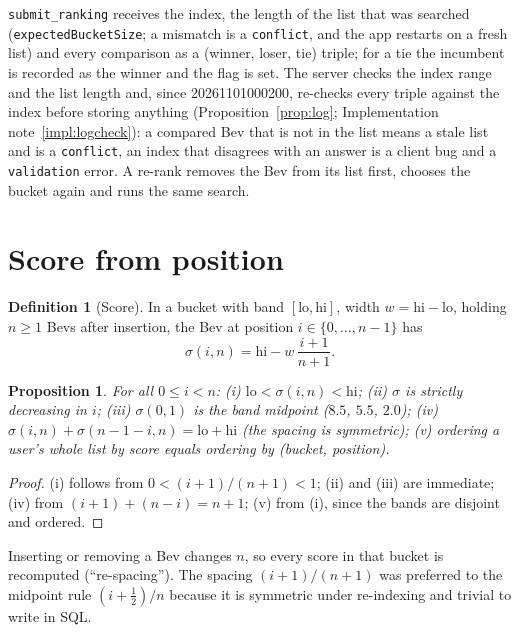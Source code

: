 \documentclass[11pt]{article}
\newcommand{\code}[1]{\texttt{#1}}
\theoremstyle{plain}
\newtheorem{proposition}[theorem]{Proposition}
\theoremstyle{definition}
\newtheorem{definition}[theorem]{Definition}
\theoremstyle{remark}
\begin{document}
\code{submit\_ranking} receives the index, the length of the list that was searched (\code{expectedBucketSize}; a mismatch is a \code{conflict}, and the app restarts on a fresh list) and every comparison as a (winner, loser, tie) triple; for a tie the incumbent is recorded as the winner and the flag is set. The server checks the index range and the list length and, since 20261101000200, re-checks every triple against the index before storing anything (Proposition~\ref{prop:log}; Implementation note~\ref{impl:logcheck}): a compared Bev that is not in the list means a stale list and is a \code{conflict}, an index that disagrees with an answer is a client bug and a \code{validation} error. A re-rank removes the Bev from its list first, chooses the bucket again and runs the same search.

\section{Score from position}\label{sec:score}

\begin{definition}[Score]
In a bucket with band $[\mathrm{lo}, \mathrm{hi}]$, width $w = \mathrm{hi} - \mathrm{lo}$, holding $n \ge 1$ Bevs after insertion, the Bev at position $i \in \{0, \dots, n-1\}$ has
\begin{equation}\label{eq:score}
\sigma(i, n) = \mathrm{hi} - w \,\frac{i + 1}{n + 1}.
\end{equation}
\end{definition}

\begin{proposition}\label{prop:score}
For all $0 \le i < n$: (i) $\mathrm{lo} < \sigma(i, n) < \mathrm{hi}$; (ii) $\sigma$ is strictly decreasing in $i$; (iii) $\sigma(0, 1)$ is the band midpoint ($8.5$, $5.5$, $2.0$); (iv) $\sigma(i, n) + \sigma(n - 1 - i, n) = \mathrm{lo} + \mathrm{hi}$ (the spacing is symmetric); (v) ordering a user's whole list by score equals ordering by (bucket, position).
\end{proposition}
\begin{proof}
(i) follows from $0 < (i+1)/(n+1) < 1$; (ii) and (iii) are immediate; (iv) from $(i + 1) + (n - i) = n + 1$; (v) from (i), since the bands are disjoint and ordered.
\end{proof}

Inserting or removing a Bev changes $n$, so every score in that bucket is recomputed (``re-spacing''). The spacing $(i+1)/(n+1)$ was preferred to the midpoint rule $(i + \tfrac12)/n$ because it is symmetric under re-indexing and trivial to write in SQL.
\end{document}

